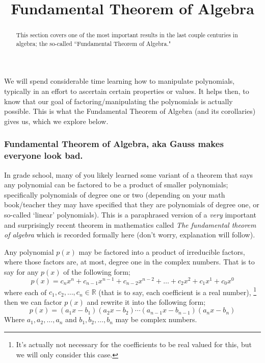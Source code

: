 \documentclass{ximera}
\title{Fundamental Theorem of Algebra}
\begin{document}
\begin{abstract}
    This section covers one of the most important results in the last couple centuries in algebra; the so-called ``Fundamental Theorem of Algebra."
\end{abstract}
\maketitle

We will spend considerable time learning how to manipulate polynomials, typically in an effort to ascertain certain properties or values. It helps then, to know that our goal of factoring/manipulating the polynomials is actually possible. This is what the Fundamental Theorem of Algebra (and its corollaries) gives us, which we explore below.


\subsubsection*{Fundamental Theorem of Algebra, aka Gauss makes everyone look bad.}
    In grade school, many of you likely learned some variant of a theorem that says any polynomial can be factored to be a product of smaller polynomials; specifically polynomials of degree one or two (depending on your math book/teacher they may have specified that they are polynomials of degree one, or so-called `linear' polynomials). This is a paraphrased version of a \textit{very} important and surprisingly recent theorem in mathematics called \textit{The fundamental theorem of algebra} which is recorded formally here (don't worry, explanation will follow).
    \begin{theorem}
        Any polynomial $p(x)$ may be factored into a product of irreducible factors, where those factors are, at most, degree one in the complex numbers. That is to say for any $p(x)$ of the following form;
        \[
            p(x) = c_nx^n + c_{n-1}x^{n-1} + c_{n-2}x^{n-2} + \dots + c_2x^2 + c_1x^1 + c_0x^0
        \]
        where each of $c_1, c_2, \dots, c_n \in \mathbb{R}$ (that is to say, each coefficient is a real number),%
        \footnote{It's actually not necessary for the coefficients to be real valued for this, but we will only consider this case.}
        then we can factor $p(x)$ and rewrite it into the following form;
        \[
            p(x) = (a_1x - b_1)(a_2x - b_2) \cdots (a_{n-1}x - b_{n-1})(a_nx - b_n)
        \]
        Where $a_1, a_2, \dots, a_n$ and $b_1, b_2, \dots, b_n$ may be complex numbers.
    \end{theorem}
    
\end{document}
